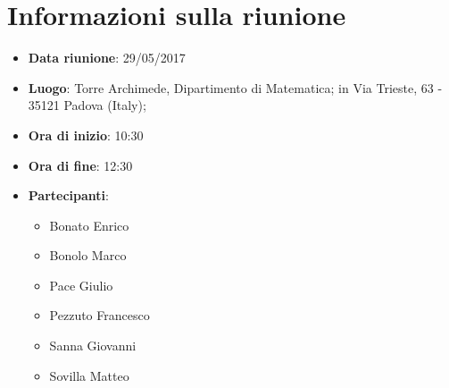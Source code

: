 \documentclass[../AnalisiDeiRequisiti.tex]{subfiles}
\begin{document}
	\section*{Informazioni sulla riunione}
		\begin{itemize}
			\item \textbf{Data riunione}: 29/05/2017
			\item \textbf{Luogo}: Torre Archimede, Dipartimento di Matematica; in Via Trieste, 63 - 35121 Padova (Italy);
			\item \textbf{Ora di inizio}: 10:30
			\item \textbf{Ora di fine}: 12:30
			\item \textbf{Partecipanti}:
				\begin{itemize}
					\item Bonato Enrico
					\item Bonolo Marco
					\item Pace Giulio
					\item Pezzuto Francesco
					\item Sanna Giovanni
					\item Sovilla Matteo
				\end{itemize}
		\end{itemize}
\end{document}
